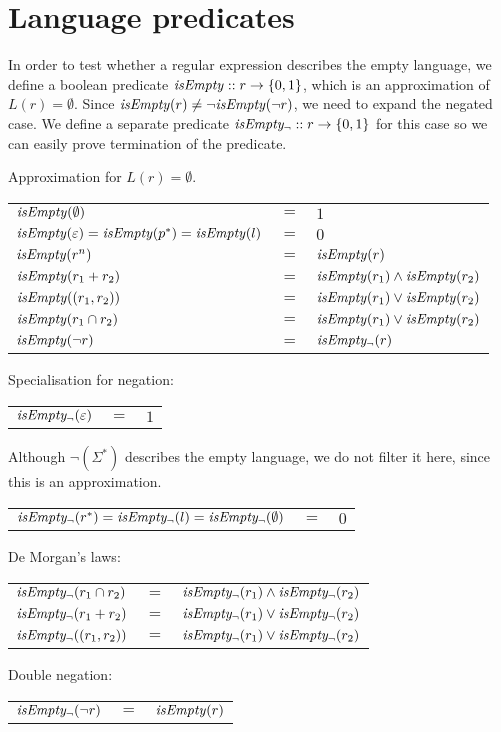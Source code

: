 \section{Language predicates}

In order to test whether a regular expression describes the empty language, we
define a boolean predicate $\mathit{isEmpty} :: r \to \{0, 1\}$, which is an
approximation of $L(r) = \emptyset$. Since $\mathit{isEmpty}(r) \neq \neg\mathit{isEmpty}(\neg
r)$, we need to expand the negated case. We define a separate predicate
$\mathit{isEmpty_\neg} :: r \to \{0, 1\}$ for this case so we can easily prove termination
of the predicate.

\begin{defn}
   Approximation for $L(r) = \emptyset$.

   \begin{tabular}{lll}
      $\mathit{isEmpty}(\emptyset)$	& $=$ & $1$ \\
      $\mathit{isEmpty}(\varepsilon) = \mathit{isEmpty}(p^*) = \mathit{isEmpty}(l)$
         & $=$ & $0$ \\
      $\mathit{isEmpty}(r^n)$		& $=$ & $\mathit{isEmpty}(r)$ \\
      $\mathit{isEmpty}(r_1 + r_2)$	& $=$ & $\mathit{isEmpty}(r_1) \wedge \mathit{isEmpty}(r_2)$ \\
      $\mathit{isEmpty}((r_1, r_2))$	& $=$ & $\mathit{isEmpty}(r_1) \vee \mathit{isEmpty}(r_2)$ \\
      $\mathit{isEmpty}(r_1 \cap r_2)$	& $=$ & $\mathit{isEmpty}(r_1) \vee \mathit{isEmpty}(r_2)$ \\
      $\mathit{isEmpty}(\neg r)$		& $=$ & $\mathit{isEmpty_\neg}(r)$ \\
   \end{tabular}

   Specialisation for negation:

   \begin{tabular}{lll}
      $\mathit{isEmpty_\neg}(\varepsilon)$	& $=$ & $1$ \\ 
   \end{tabular}

   Although $\neg(\Sigma^*)$ describes the empty language, we do not filter it
   here, since this is an approximation.

   \begin{tabular}{lll}
      $\mathit{isEmpty_\neg}(r^*) = \mathit{isEmpty_\neg}(l) = \mathit{isEmpty_\neg}(\emptyset)$	& $=$ & $0$ \\
   \end{tabular}

   De Morgan's laws:

   \begin{tabular}{lll}
      $\mathit{isEmpty_\neg}(r_1 \cap r_2)$	& $=$ & $\mathit{isEmpty_\neg}(r_1) \wedge \mathit{isEmpty_\neg}(r_2)$ \\
      $\mathit{isEmpty_\neg}(r_1 + r_2)$	& $=$ & $\mathit{isEmpty_\neg}(r_1) \vee \mathit{isEmpty_\neg}(r_2)$ \\
      $\mathit{isEmpty_\neg}((r_1, r_2))$	& $=$ & $\mathit{isEmpty_\neg}(r_1) \vee \mathit{isEmpty_\neg}(r_2)$ \\
   \end{tabular}

   Double negation:

   \begin{tabular}{lll}
      $\mathit{isEmpty_\neg}(\neg r)$	& $=$ & $\mathit{isEmpty}(r)$ \\
   \end{tabular}
\end{defn}


